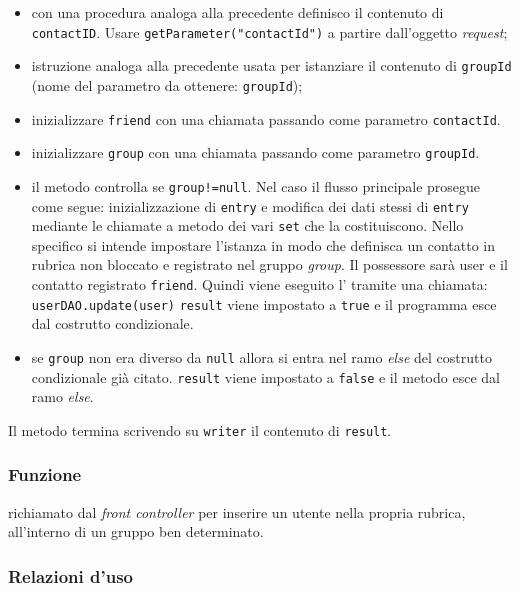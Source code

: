 \begin{description}
	\begin{itemize}
		\item con una procedura analoga alla precedente definisco il contenuto di \texttt{contactID}. Usare \verb|getParameter("contactId")| a partire dall'oggetto \textit{request};
		\item istruzione analoga alla precedente usata per istanziare il contenuto di \texttt{groupId} (nome del parametro da ottenere: \texttt{groupId});
		\item inizializzare \texttt{friend} con una chiamata  passando come parametro \texttt{contactId}.
		\item inizializzare \texttt{group} con una chiamata  passando come parametro \texttt{groupId}.
		\item il metodo controlla se \texttt{group!=null}. Nel caso il flusso principale prosegue come segue: inizializzazione di \texttt{entry} e modifica dei dati stessi di \texttt{entry} mediante le chiamate a metodo dei vari \texttt{set} che la costituiscono. Nello specifico si intende impostare l'istanza in modo che definisca un contatto in rubrica non bloccato e registrato nel gruppo \textit{group}. Il possessore sarà user e il contatto registrato \texttt{friend}. Quindi viene eseguito l' tramite una chiamata:\\
		\verb|userDAO.update(user)|
		\texttt{result} viene impostato a \texttt{true} e il programma esce dal costrutto condizionale.
		\item se \texttt{group} non era diverso da \texttt{null} allora si entra nel ramo \textit{else} del costrutto condizionale già citato. \texttt{result} viene impostato a \texttt{false} e il metodo esce dal ramo \textit{else}.
	\end{itemize}
	Il metodo termina scrivendo su \texttt{writer} il contenuto di \texttt{result}.
	
\end{description}



\subsubsection*{Funzione}
 richiamato dal \textit{front controller} per inserire un utente nella propria rubrica, all'interno di un gruppo ben determinato.

\subsubsection*{Relazioni d'uso}

